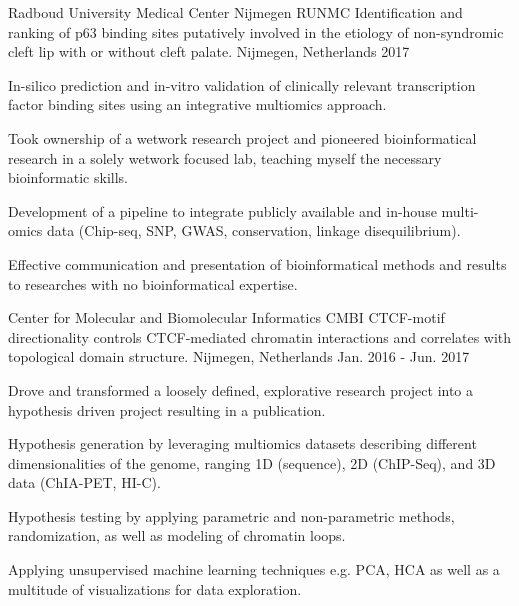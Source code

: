 

\begin{cventries}

  \cventry
    {Radboud University Medical Center Nijmegen RUNMC} %
    {Identification and ranking of p63 binding sites putatively
    involved in the etiology of non-syndromic cleft lip with or
    without cleft palate.} %
    {Nijmegen, Netherlands} %
    {2017} %
    { 
      \begin{cvitems} %
        \item {In-silico prediction and in-vitro validation of clinically relevant transcription factor binding sites using an integrative multiomics approach.}
        \item {Took ownership of a wetwork research project and pioneered bioinformatical research in a solely wetwork focused lab, teaching myself the necessary bioinformatic skills.}
        \item {Development of a pipeline to integrate publicly available and in-house multi-omics data (Chip-seq, SNP, GWAS, conservation, linkage disequilibrium).}
        \item {Effective communication and presentation of bioinformatical methods and results to researches with no bioinformatical expertise.}
      \end{cvitems}
    }

  \cventry
    {Center for Molecular and Biomolecular Informatics CMBI} %
    {CTCF-motif directionality controls CTCF-mediated chromatin interactions
    and correlates with topological domain structure.} %
    {Nijmegen, Netherlands} %
    {Jan. 2016 - Jun. 2017} %
    {
      \begin{cvitems} %
        \item {Drove and transformed a loosely defined, explorative research project into a hypothesis driven project resulting in a publication.}
        \item {Hypothesis generation by leveraging multiomics datasets describing different dimensionalities of the genome, ranging 1D (sequence), 2D (ChIP-Seq), and 3D data (ChIA-PET, HI-C).}
        \item {Hypothesis testing by applying parametric and non-parametric methods, randomization, as well as modeling of chromatin loops.}
        \item {Applying unsupervised machine learning techniques e.g. PCA, HCA as well as a multitude of visualizations for data exploration.}
      \end{cvitems}
    }
    

\end{cventries}
